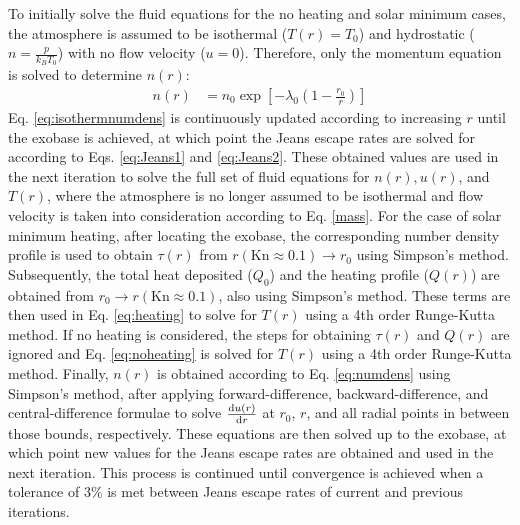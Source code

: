 \documentclass[times,12]{article}
\begin{document}
\indent To initially solve the fluid equations for the no heating and solar minimum cases, the atmosphere is assumed to be isothermal ($T(r) = T_0$) and hydrostatic ($n = \frac{p}{k_B T_0}$) with no flow velocity ($u = 0$). Therefore, only the momentum equation is solved to determine $n(r)$:
\begin{align}
n(r) &= n_0 \exp \left[-\lambda_0 \left(1 - \frac{r_0}{r} \right)\right]
\label{eq:isothermnumdens}
\end{align}
\noindent Eq. \ref{eq:isothermnumdens} is continuously updated according to increasing $r$ until the exobase is achieved, at which point the Jeans escape rates are solved for according to Eqs. \ref{eq:Jeans1} and \ref{eq:Jeans2}. These obtained values are used in the next iteration to solve the full set of fluid equations for $n(r), u(r)$, and $T(r)$, where the atmosphere is no longer assumed to be isothermal and flow velocity is taken into consideration according to Eq. \ref{mass}. For the case of solar minimum heating, after locating the exobase, the corresponding number density profile is used to obtain $\tau(r)$ from $r(\mathrm{Kn} \approx 0.1) \rightarrow r_0$ using Simpson's method. Subsequently, the total heat deposited ($Q_0$) and the heating profile ($Q(r)$) are obtained from $r_0 \rightarrow r(\mathrm{Kn} \approx 0.1)$, also using Simpson's method. These terms are then used in Eq. \ref{eq:heating} to solve for $T(r)$ using a 4th order Runge-Kutta method. If no heating is considered, the steps for obtaining $\tau(r)$ and $Q(r)$ are ignored and Eq. \ref{eq:noheating} is solved for $T(r)$ using a 4th order Runge-Kutta method. Finally, $n(r)$ is obtained according to Eq. \ref{eq:numdens} using Simpson's method, after applying forward-difference, backward-difference, and central-difference formulae to solve $\dv{u(r)}{r}$ at $r_0$, $r$, and all radial points in between those bounds, respectively. These equations are then solved up to the exobase, at which point new values for the Jeans escape rates are obtained and used in the next iteration. This process is continued until convergence is achieved when a tolerance of $3\%$ is met between Jeans escape rates of current and previous iterations.\\
\end{document}
